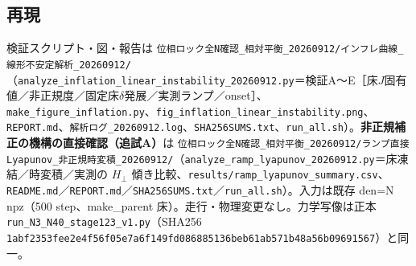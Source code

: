 \documentclass[
  a4paper,
]{ltjsarticle}
\begin{document}
\subsection{再現}\label{ux518dux73fe}

検証スクリプト・図・報告は
\texttt{位相ロック全N確認\_相対平衡\_20260912/インフレ曲線\_線形不安定解析\_20260912/}（\texttt{analyze\_inflation\_linear\_instability\_20260912.py}＝検証A〜E［床\(J\)固有値／非正規度／固定床\(\delta\)発展／実測ランプ／onset］、\texttt{make\_figure\_inflation.py}、\texttt{fig\_inflation\_linear\_instability.png}、\texttt{REPORT.md}、\texttt{解析ログ\_20260912.log}、\texttt{SHA256SUMS.txt}、\texttt{run\_all.sh}）。\textbf{非正規補正の機構の直接確認（追試A）}は
\texttt{位相ロック全N確認\_相対平衡\_20260912/ランプ直接Lyapunov\_非正規時変積\_20260912/}（\texttt{analyze\_ramp\_lyapunov\_20260912.py}＝床凍結／時変積／実測の
\(H_\perp\)
傾き比較、\texttt{results/ramp\_lyapunov\_summary.csv}、\texttt{README.md}／\texttt{REPORT.md}／\texttt{SHA256SUMS.txt}／\texttt{run\_all.sh}）。入力は既存
den=N npz（500 step、make\_parent
床）。走行・物理変更なし。力学写像は正本
\texttt{run\_N3\_N40\_stage123\_v1.py}（SHA256
\texttt{1abf2353fee2e4f56f05e7a6f149fd086885136beb61ab571b48a56b09691567}）と同一。
\end{document}

